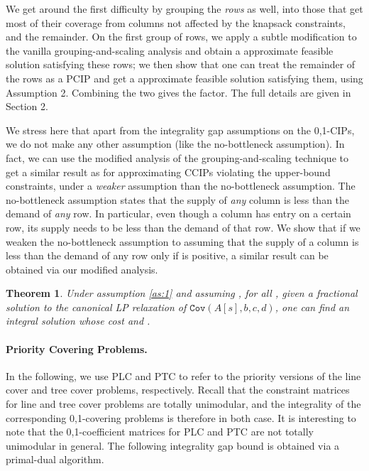 \documentclass[11pt]{article}
\newtheorem{theorem}{Theorem}
\newcommand{\cov}[1]{\ensuremath{\mathtt{Cov}(#1)}}
\newcommand{\1}{\mathbb{1}}
\begin{document}
We get around the first difficulty by grouping the {\em rows} as well,
into those that get most of their coverage from columns not affected
by the knapsack constraints, and the remainder. On the first group of
rows, we apply a subtle modification to the vanilla
grouping-and-scaling analysis and obtain a 
approximate feasible solution satisfying these rows; we then show that
one can treat the remainder of the rows as a PCIP and get a
 approximate feasible solution satisfying them, using
Assumption 2. Combining the two gives the  factor.
The full details are given in Section 2.

We stress here that apart from the integrality gap
assumptions on the 0,1-CIPs, we do not make any other assumption
(like the no-bottleneck assumption). In fact, we can use the modified
analysis of the grouping-and-scaling technique to get a similar result
as \cite{Ko03} for approximating CCIPs violating the upper-bound
constraints, under a {\em weaker} assumption than the no-bottleneck
assumption. The no-bottleneck assumption states that the
supply of {\em any} column is less than the demand of {\em any} row.
In particular, even though a column has entry  on a certain row,
its supply needs to be less than the demand of that row. We show that
if we weaken the no-bottleneck assumption to assuming that the supply
of a column  is less than the demand of any row  only if
 is positive, a similar result can be obtained via our modified analysis.


\begin{theorem}\label{thm:2}
  Under assumption \ref{as:1} and assuming , for
  all , given a fractional solution  to the canonical LP
  relaxation of \cov{A[s],b,c,d}, one can find an integral solution
   whose cost  and .
\end{theorem}

\paragraph{Priority Covering Problems.}
In the following, we use PLC and PTC to refer to the priority versions
of the line cover and tree cover problems, respectively. 
Recall that the constraint matrices for line and tree cover problems
are totally unimodular, and the integrality of the corresponding 
0,1-covering problems is therefore  in both case. It is
interesting to note that the 0,1-coefficient matrices for PLC and 
PTC are not totally unimodular in general. 
The following integrality gap bound is obtained via a primal-dual
algorithm.
\end{document}
